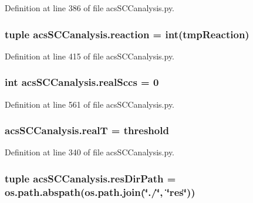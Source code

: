 Definition at line 386 of file acs\-S\-C\-Canalysis.\-py.

\hypertarget{a00128_a58c3618ec28f27dfbf09e0d3aba05bc7}{
\subsubsection[{reaction}]{\setlength{\rightskip}{0pt plus 5cm}tuple acs\-S\-C\-Canalysis.\-reaction = int(tmp\-Reaction)}}\label{a00128_a58c3618ec28f27dfbf09e0d3aba05bc7}


Definition at line 415 of file acs\-S\-C\-Canalysis.\-py.

\hypertarget{a00128_ac6aaa0ac5d13b0736ab3179dc1ed388d}{
\subsubsection[{real\-Sccs}]{\setlength{\rightskip}{0pt plus 5cm}int acs\-S\-C\-Canalysis.\-real\-Sccs = 0}}\label{a00128_ac6aaa0ac5d13b0736ab3179dc1ed388d}


Definition at line 561 of file acs\-S\-C\-Canalysis.\-py.

\hypertarget{a00128_a1c9b45f6074222ace96b7ab38cb8e23b}{
\subsubsection[{real\-T}]{\setlength{\rightskip}{0pt plus 5cm}acs\-S\-C\-Canalysis.\-real\-T = {\bf threshold}}}\label{a00128_a1c9b45f6074222ace96b7ab38cb8e23b}


Definition at line 340 of file acs\-S\-C\-Canalysis.\-py.

\hypertarget{a00128_a9ededb3cd7c63befde39ad68e5f9e006}{
\subsubsection[{res\-Dir\-Path}]{\setlength{\rightskip}{0pt plus 5cm}tuple acs\-S\-C\-Canalysis.\-res\-Dir\-Path = os.\-path.\-abspath(os.\-path.\-join(\char`\"{}./\char`\"{}, \char`\"{}res\char`\"{}))}}\label{a00128_a9ededb3cd7c63befde39ad68e5f9e006}


